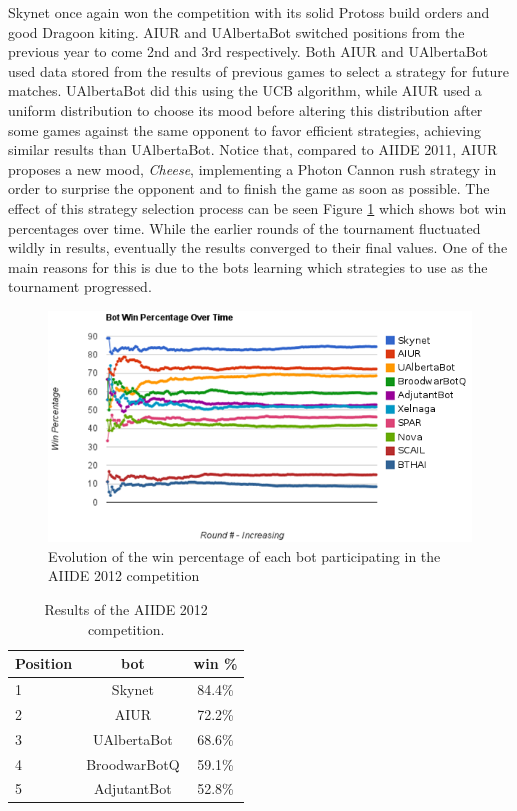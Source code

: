 \documentclass[journal]{IEEEtran}
\begin{document}
Skynet once  again won  the competition with  its solid  Protoss build
orders  and  good  Dragoon  kiting.   AIUR  and  UAlbertaBot  switched
positions from  the previous  year to come  2nd and  3rd respectively.
Both  AIUR  and UAlbertaBot  used  data  stored  from the  results  of
previous games  to select a strategy for  future matches.  UAlbertaBot
did  this  using  the  UCB  \cite{auer2002finite} algorithm,  while  AIUR  used  a  uniform
distribution  to choose  its  mood before  altering this  distribution
after  some  games  against  the  same  opponent  to  favor  efficient
strategies, achieving  similar results than  UAlbertaBot. Notice that,
compared  to AIIDE 2011,  AIUR proposes  a new  mood, \textit{Cheese},
implementing a  Photon Cannon rush  strategy in order to  surprise the
opponent and  to finish the game  as soon as possible.   The effect of
this strategy selection process can be seen Figure \ref{fig:aiide2012}
which shows bot  win percentages over time.  While  the earlier rounds
of the tournament fluctuated wildly in results, eventually the results
converged to their  final values. One of the main  reasons for this is
due to  the bots  learning which strategies  to use as  the tournament
progressed.

\begin{figure}[t!]
    \centering
    \includegraphics[width=\columnwidth]{figures/aiide2012_v2}
    \caption{Evolution of the win percentage of each bot participating in the AIIDE 2012 competition}
    \label{fig:aiide2012}
\end{figure}


\begin{table}[t!]
\caption{Results of the AIIDE 2012 competition.}
\label{tab:aiide2012}
\begin{small}
\begin{center}
\begin{tabular}{|l|c|c|}
\hline
Position & bot & win \% \\ \hline
1 & Skynet & 84.4\% \\
2 & AIUR & 72.2\% \\
3 & UAlbertaBot & 68.6\% \\
4 & BroodwarBotQ & 59.1\% \\
5 & AdjutantBot & 52.8\% \\ \hline
\end{tabular}
\end{center}
\end{small}
\end{table}
\end{document}
